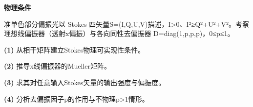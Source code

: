 \textbf{物理条件}\par 准单色部分偏振光以 Stokes 四矢量S=(I,Q,U,V)描述，I>0、I²≥Q²+U²+V²。考察理想线偏振器（透射x偏振）与各向同性去偏振器 D=diag(1,p,p,p)，0≤p≤1。
\par\noindent\textbf{(1)} 从相干矩阵建立Stokes物理可实现性条件。
\par\noindent\textbf{(2)} 推导x线偏振器的Mueller矩阵。
\par\noindent\textbf{(3)} 求其对任意输入Stokes矢量的输出强度与偏振度。
\par\noindent\textbf{(4)} 分析去偏振因子p的作用与不物理p>1情形。
